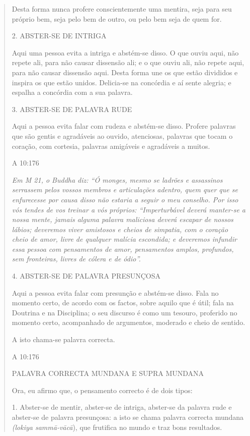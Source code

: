 \begin{quote}
Desta forma nunca profere conscientemente uma mentira, seja para seu próprio bem, seja pelo bem de outro, ou pelo bem seja de quem for.

2. ABSTER-SE DE INTRIGA

Aqui uma pessoa evita a intriga e abstém-se disso. O que ouviu aqui, não repete ali, para não causar dissensão ali; e o que ouviu ali, não repete aqui, para não causar dissensão aqui. Desta forma une os que estão divididos e inspira os que estão unidos. Delicia-se na concórdia e aí sente alegria; e espalha a concórdia com a sua palavra.

3. ABSTER-SE DE PALAVRA RUDE

Aqui a pessoa evita falar com rudeza e abstém-se disso. Profere palavras que são gentis e agradáveis ao ouvido, atenciosas, palavras que tocam o coração, com cortesia, palavras amigáveis e agradáveis a muitos.

A 10:176

\emph{Em M 21, o Buddha diz: ``Ó monges, mesmo se ladrões e assassinos serrassem pelos vossos membros e articulações adentro, quem quer que se enfurecesse por causa disso não estaria a seguir o meu conselho. Por isso vós tendes de vos treinar a vós próprios: ``Imperturbável deverá manter-se a nossa mente, jamais alguma palavra maliciosa deverá escapar de nossos lábios; deveremos viver amistosos e cheios de simpatia, com o coração cheio de amor, livre de qualquer malícia escondida; e deveremos infundir essa pessoa com pensamentos de amor, pensamentos amplos, profundos, sem fronteiras, livres de cólera e de ódio''.}

4. ABSTER-SE DE PALAVRA PRESUNÇOSA

Aqui a pessoa evita falar com presunção e abstém-se disso. Fala no momento certo, de acordo com os factos, sobre aquilo que é útil; fala na Doutrina e na Disciplina; o seu discurso é como um tesouro, proferido no momento certo, acompanhado de argumentos, moderado e cheio de sentido.

A isto chama-se palavra correcta.

A 10:176

PALAVRA CORRECTA MUNDANA E SUPRA MUNDANA

Ora, eu afirmo que, o pensamento correcto é de dois tipos:

1. Abster-se de mentir, abster-se de intriga, abster-se da palavra rude e abster-se de palavra presunçosa: a isto se chama palavra correcta mundana \emph{(lokiya sammā-vācā}), que frutifica no mundo e traz bons resultados.


\end{quote}
